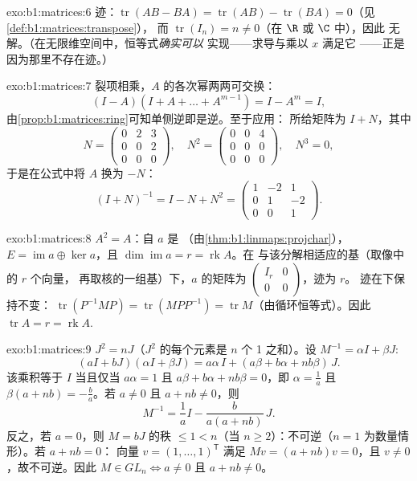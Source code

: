\begin{solution}{exo:b1:matrices:6}
迹：$\operatorname{tr}(AB - BA) = \operatorname{tr}(AB) -
\operatorname{tr}(BA) = 0$（见\cref{def:b1:matrices:transpose}），
而 $\operatorname{tr}(I_n) = n \neq 0$（在 $\R$ 或 $\C$ 中），因此
无解。（在无限维空间中，恒等式\emph{确实可以}
实现——求导与乘以 $x$ 满足它
——正是因为那里不存在迹。）
\end{solution}

\begin{solution}{exo:b1:matrices:7}
裂项相乘，$A$ 的各次幂两两可交换：
\[
(I - A)(I + A + \dots + A^{m-1}) = I - A^m = I ,
\]
由\cref{prop:b1:matrices:ring}可知单侧逆即是逆。至于应用：
所给矩阵为 $I + N$，其中
\[
N = \begin{pmatrix} 0 & 2 & 3\\ 0 & 0 & 2\\ 0&0&0 \end{pmatrix},
\quad
N^2 = \begin{pmatrix} 0&0&4\\ 0&0&0\\ 0&0&0\end{pmatrix},
\quad N^3 = 0 ,
\]
于是在公式中将 $A$ 换为 $-N$：
\[
(I + N)^{-1} = I - N + N^2 =
\begin{pmatrix}
1 & -2 & 1\\
0 & 1 & -2\\
0 & 0 & 1
\end{pmatrix}.
\]
\end{solution}

\begin{solution}{exo:b1:matrices:8}
$A^2 = A$：自 $a$ 是
（由\cref{thm:b1:linmaps:projchar}），$E = \operatorname{im} a \oplus
\ker a$，且 $\dim\operatorname{im} a = r = \operatorname{rk} A$。在
与该分解相适应的基（取像中的 $r$ 个向量，
再取核的一组基）下，$a$ 的矩阵为
$\begin{pmatrix} I_r & 0\\ 0 & 0\end{pmatrix}$，迹为 $r$。
迹在下保持不变：
$\operatorname{tr}(P^{-1}MP) = \operatorname{tr}(MPP^{-1}) =
\operatorname{tr} M$（由循环恒等式）。因此
$\operatorname{tr} A = r = \operatorname{rk} A$.
\end{solution}

\begin{solution}{exo:b1:matrices:9}
$J^2 = nJ$（$J^2$ 的每个元素是 $n$ 个 1 之和）。设 $M^{-1} =
\alpha I + \beta J$:
\[
(aI + bJ)(\alpha I + \beta J)
= a\alpha\, I + (a\beta + b\alpha + nb\beta)\, J .
\]
该乘积等于 $I$ 当且仅当 $a\alpha = 1$ 且 $a\beta + b\alpha + nb\beta =
0$，即 $\alpha = \frac1a$ 且 $\beta(a + nb) = -\frac ba$。若 $a
\neq 0$ 且 $a + nb \neq 0$，则
\[
M^{-1} = \frac 1a I - \frac{b}{a(a + nb)}\, J .
\]
反之，若 $a = 0$，则 $M = bJ$ 的秩 $\leq 1 < n$（当 $n \geq
2$）：不可逆（$n = 1$ 为数量情形）。若 $a + nb = 0$：
向量 $v = (1, \dots, 1)^{\mathsf T}$ 满足 $Mv = (a +
nb)v = 0$，且 $v \neq 0$，故不可逆。因此 $M \in GL_n \iff a
\neq 0$ 且 $a + nb \neq 0$。
\end{solution}

